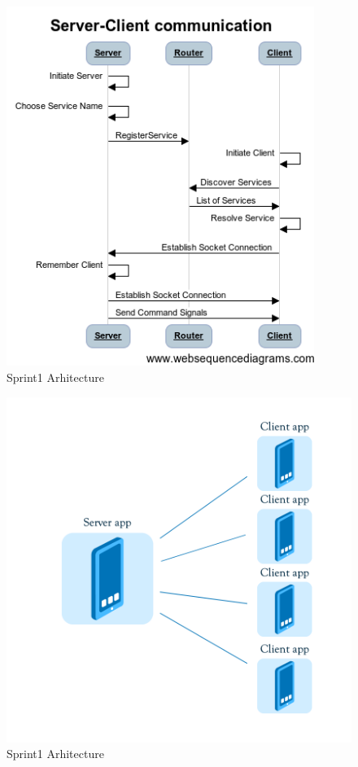 \begin{figure}[!t]
	\centering
		\includegraphics[width=10cm]{sprint1/Server-Client communication.png}
	\caption{Sprint1 Arhitecture}
	\label{fig:sprint1_arhitecture}
\end{figure}



\begin{figure}[!t]
	\centering
		\includegraphics[width=16cm]{sprint1/arhitecture.png}
	\caption{Sprint1 Arhitecture}
	\label{fig:sprint1_arhitecture}
\end{figure}

